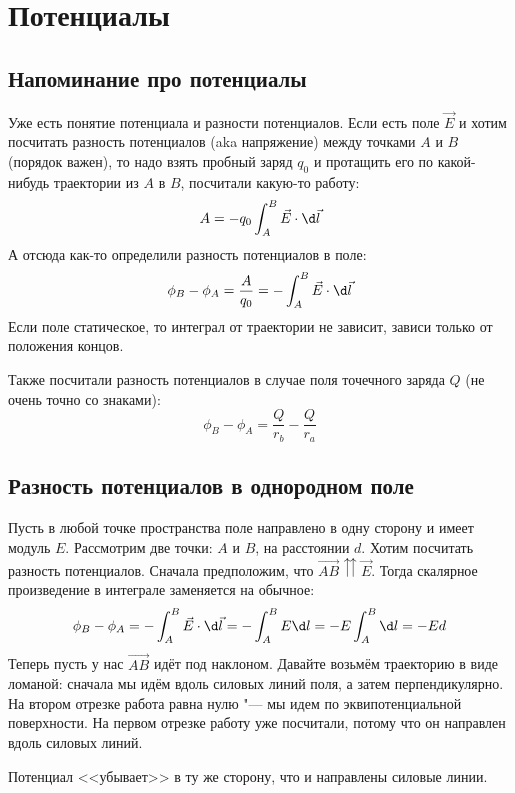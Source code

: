 
\chapter{Потенциалы}

\section{Напоминание про потенциалы}
  Уже есть понятие потенциала и разности потенциалов.
  Если есть поле $\vec E$ и хотим посчитать разность потенциалов (aka напряжение) между точками $A$ и $B$ (порядок важен),
  то надо взять пробный заряд $q_0$ и протащить его по какой-нибудь траектории из $A$ в $B$,
  посчитали какую-то работу:
  \[A = -q_0 \int_A^B \vec E \cdot \d\vec l\]
  А отсюда как-то определили разность потенциалов в поле:
  \[\phi_B-\phi_A = \frac{A}{q_0} = -\int_A^B \vec E \cdot \d \vec l\]
  Если поле статическое, то интеграл от траектории не зависит, зависи только от положения концов.

  Также посчитали разность потенциалов в случае поля точечного заряда $Q$ (не очень точно со знаками):
  \[ \phi_B-\phi_A = \frac{Q}{r_b} - \frac{Q}{r_a}\]

\section{Разность потенциалов в однородном поле}
  Пусть в любой точке пространства поле направлено в одну сторону и имеет модуль $E$.
  Рассмотрим две точки: $A$ и $B$, на расстоянии $d$.
  Хотим посчитать разность потенциалов.
  Сначала предположим, что $\vec{AB} \upuparrows \vec E$.
  Тогда скалярное произведение в интеграле заменяется на обычное:
  \[\phi_B - \phi_A = -\int_A^B \vec E \cdot \d \vec l = -\int_A^B E \d l = -E \int_A^B \d l = -Ed \]
  Теперь пусть у нас $\vec{AB}$ идёт под наклоном.
  Давайте возьмём траекторию в виде ломаной: сначала мы идём вдоль силовых линий поля, а затем перпендикулярно.
  На втором отрезке работа равна нулю "--- мы идем по эквипотенциальной поверхности.
  На первом отрезке работу уже посчитали, потому что он направлен вдоль силовых линий.
  \begin{Rem}
    Потенциал <<убывает>> в ту же сторону, что и направлены силовые линии.
  \end{Rem}

